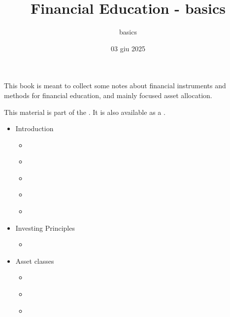\documentclass[letterpaper,10pt,italian]{jupyterBook}
\title{Financial Education - basics}
\date{03 giu 2025}
\author{basics}
\begin{document}
\pagestyle{empty}
\sphinxmaketitle
\pagestyle{plain}
\sphinxtableofcontents
\pagestyle{normal}
\label{\detokenize{intro::doc}}


\sphinxAtStartPar
This book is meant to collect some notes about financial instruments and methods for financial education, and mainly focused asset allocation.

\sphinxAtStartPar
This material is part of the . It is also available as a .
\begin{itemize}
\item {} 
\sphinxAtStartPar
Introduction

\begin{itemize}
\item {} 
\sphinxAtStartPar
{\hyperref[\detokenize{ch/summary::doc}]{}}

\item {} 
\sphinxAtStartPar
{\hyperref[\detokenize{ch/references::doc}]{}}

\item {} 
\sphinxAtStartPar
{\hyperref[\detokenize{ch/actors::doc}]{}}

\item {} 
\sphinxAtStartPar
{\hyperref[\detokenize{ch/inflation::doc}]{}}

\item {} 
\sphinxAtStartPar
{\hyperref[\detokenize{ch/policy::doc}]{}}

\end{itemize}
\end{itemize}
\begin{itemize}
\item {} 
\sphinxAtStartPar
Investing Principles

\begin{itemize}
\item {} 
\sphinxAtStartPar
{\hyperref[\detokenize{ch/principles/intro::doc}]{}}

\end{itemize}
\end{itemize}
\begin{itemize}
\item {} 
\sphinxAtStartPar
Asset classes

\begin{itemize}
\item {} 
\sphinxAtStartPar
{\hyperref[\detokenize{ch/assets/intro::doc}]{}}

\item {} 
\sphinxAtStartPar
{\hyperref[\detokenize{ch/assets/bonds::doc}]{}}

\item {} 
\sphinxAtStartPar
{\hyperref[\detokenize{ch/assets/equity::doc}]{}}

\end{itemize}
\end{itemize}
\end{document}
